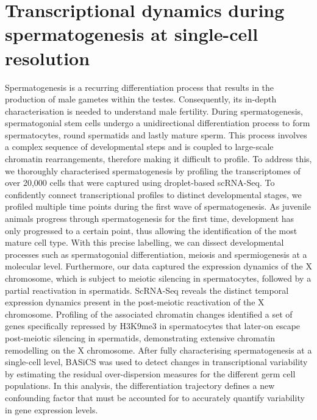 
\chapter{Transcriptional dynamics during spermatogenesis at single-cell resolution}  

\graphicspath{{"../../Dropbox (Cambridge  University)/Figures_for_thesis/Chapter3/"}}

\begin{Abstract}
\hspace{-5mm} Spermatogenesis is a recurring differentiation process that results in the production of male gametes within the testes. Consequently, its in-depth characterisation is needed to understand male fertility. During spermatogenesis, spermatogonial stem cells undergo a unidirectional differentiation process to form spermatocytes, round spermatids and lastly mature sperm. This process involves a complex sequence of developmental steps and is coupled to large-scale chromatin rearrangements, therefore making it difficult to profile. To address this, we thoroughly characterised spermatogenesis by   profiling the transcriptomes of over 20,000 cells that were captured using droplet-based scRNA-Seq. To confidently connect transcriptional profiles to distinct developmental stages, we profiled multiple time points during the first wave of spermatogenesis. As juvenile animals progress through spermatogenesis for the first time, development has only progressed to a certain point, thus allowing the identification of the most mature cell type. With this precise labelling, we can dissect developmental processes such as spermatogonial differentiation, meiosis and spermiogenesis at a molecular level. Furthermore, our data captured the expression dynamics of the X chromosome, which is subject to meiotic silencing in spermatocytes, followed by a partial reactivation in spermatids. ScRNA-Seq reveals the distinct temporal expression dynamics present in the post-meiotic reactivation of the X chromosome. Profiling of the associated chromatin changes identified a set of genes specifically repressed by H3K9me3 in spermatocytes that later-on escape post-meiotic silencing in spermatids, demonstrating extensive chromatin remodelling on the X chromosome. After fully characterising spermatogenesis at a single-cell level, BASiCS was used to detect changes in transcriptional variability by estimating the residual over-dispersion measures for the different germ cell populations. In this analysis, the differentiation trajectory defines a new confounding factor that must be accounted for to accurately quantify variability in gene expression levels.  
\end{Abstract}

